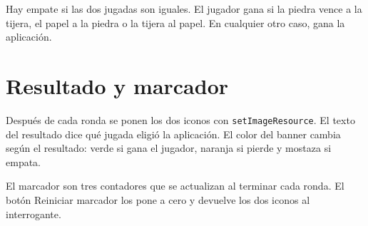 Hay empate si las dos jugadas son iguales.
El jugador gana si la piedra vence a la tijera, el papel a la piedra o la tijera al papel.
En cualquier otro caso, gana la aplicación.

\section{Resultado y marcador}
Después de cada ronda se ponen los dos iconos con \texttt{setImageResource}.
El texto del resultado dice qué jugada eligió la aplicación.
El color del banner cambia según el resultado: verde si gana el jugador, naranja si pierde y mostaza si empata.

El marcador son tres contadores que se actualizan al terminar cada ronda.
El botón Reiniciar marcador los pone a cero y devuelve los dos iconos al interrogante.